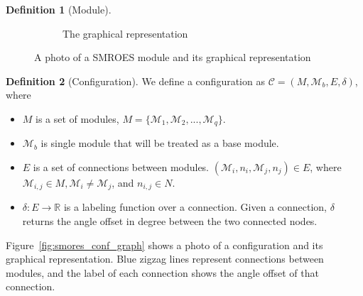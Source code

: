 \documentclass[conference]{IEEEtran}
\theoremstyle{definition}
\newtheorem{definition}{Definition}[section]
\begin{document}
\begin{definition}[Module]
\begin{figure}
\begin{center}
\begin{subfigure}[b]{0.4\columnwidth}
           	\caption{The graphical representation}
           	\label{fig:smores_graph}
	\end{subfigure}
\end{center}
\caption{A photo of a SMROES module and its graphical representation}
\label{fig:smores}
\end{figure}
\end{definition}

\begin{definition}[Configuration] 
We define a configuration as $\mathcal{C}=(M, \mathcal{M}_b, E, \delta)$, where
\begin{itemize}
\item $M$ is a set of modules, $M=\{\mathcal{M}_1, \mathcal{M}_2, ..., \mathcal{M}_q\}$.
\item $\mathcal{M}_b$ is single module that will be treated as a base module.
\item $E$ is a set of connections between modules. $(\mathcal{M}_i, n_i, \mathcal{M}_j, n_j)\in E$, where $\mathcal{M}_{i,j} \in M, \mathcal{M}_i \neq \mathcal{M}_j$, and $n_{i,j}\in N$.
\item $\delta: E \rightarrow \mathbb{R}$ is a labeling function over a connection. Given a connection, $\delta$ returns the angle offset in degree between the two connected nodes.
\end{itemize}
Figure~\ref{fig:smores_conf_graph} shows a photo of a configuration and its graphical representation. Blue zigzag lines represent connections between modules, and the label of each connection shows the angle offset of that connection.
\end{definition}
\end{document}
